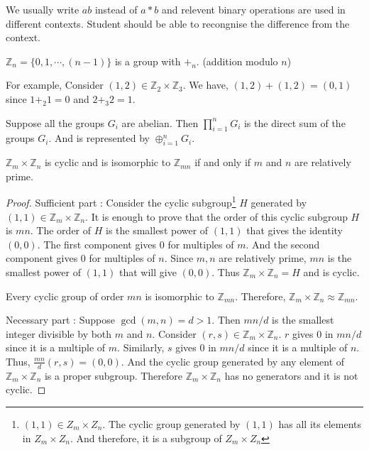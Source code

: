 \begin{remark}
	We usually write $ab$ instead of $a \ast b$ and relevent binary operations are used in different contexts.
	Student should be able to recongnise the difference from the context.
\end{remark}

\begin{remark}
	$\mathbb{Z}_n = \{ 0,1,\cdots,(n-1) \}$ is a group with $+_n$.
	(addition modulo $n$)

	For example, Consider $(1,2) \in \mathbb{Z}_2 \times \mathbb{Z}_3$.
	We have, $(1,2) + (1,2) = (0,1)$ since $1 +_2 1=0$ and $2 +_3 2 = 1$.
\end{remark}

\begin{definition}
	Suppose all the groups $G_i$ are abelian.
	Then $\prod\limits_{i = 1}^n G_i$ is the direct sum of the groups $G_i$.
	And is represented by $\oplus_{i = 1}^n G_i$.
\end{definition}

\begin{theorem}
	$\mathbb{Z}_m \times \mathbb{Z}_n$ is cyclic and is isomorphic to $\mathbb{Z}_{mn}$ if and only if $m$ and $n$ are relatively prime.
\end{theorem}
\begin{proof}
	Sufficient part :
	Consider the cyclic subgroup\footnote{$(1,1) \in Z_m \times Z_n$.
	The cyclic group generated by $(1,1)$ has all its elements in $Z_m \times Z_n$.
	And therefore, it is a subgroup of $Z_m \times Z_n$} $H$ generated by $(1,1) \in \mathbb{Z}_m \times \mathbb{Z}_n$.
	It is enough to prove that the order of this cyclic subgroup $H$ is $mn$.
	The order of $H$ is the smallest power of $(1,1)$ that gives the identity $(0,0)$.
	The first component gives $0$ for multiples of $m$.
	And the second component gives $0$ for multiples of $n$.
	Since $m,n$ are relatively prime, $mn$ is the smallest power of $(1,1)$ that will give $(0,0)$.
	Thus $\mathbb{Z}_m \times \mathbb{Z}_n = H$ and is cyclic.
	\begin{important} Every cyclic group of order $mn$ is isomorphic to $\mathbb{Z}_{mn}$. Therefore, $\mathbb{Z}_m \times \mathbb{Z}_n \approx \mathbb{Z}_{mn}$.\end{important}

	Necessary part :
	Suppose $\gcd(m,n) = d > 1$.
	Then $mn/d$ is the smallest integer divisible by both $m$ and $n$.
	Consider $(r,s) \in \mathbb{Z}_m \times \mathbb{Z}_n$.
	$r$ gives $0$ in $mn/d$ since it is a multiple of $m$.
	Similarly, $s$ gives $0$ in $mn/d$ since it is a multiple of $n$.
	Thus, $\frac{mn}{d} (r,s) = (0,0)$.
	And the cyclic group generated by any element of $\mathbb{Z}_m \times \mathbb{Z}_n$ is a proper subgroup.
	Therefore $\mathbb{Z}_m \times \mathbb{Z}_n$ has no generators and it is not cyclic.
\end{proof}

